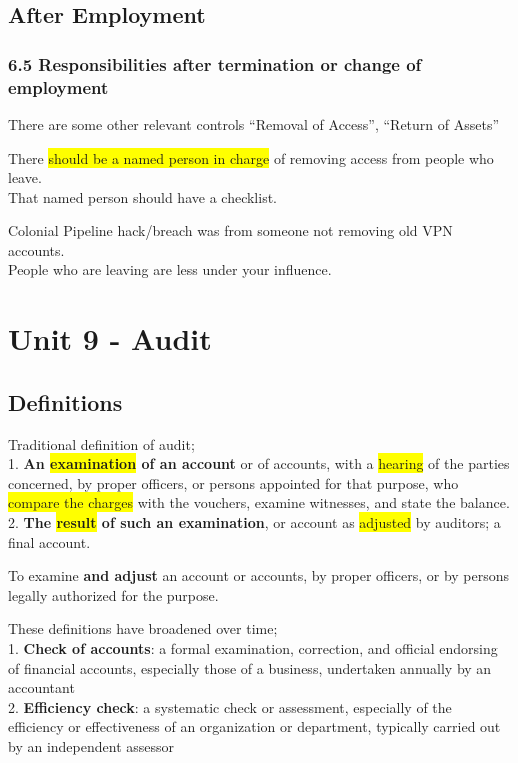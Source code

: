 \documentclass[tikz,border=10pt]{project_plan}
\begin{document}
\section{After Employment}

\subsection{6.5 Responsibilities after termination or change of employment}

There are some other relevant controls “Removal of Access”, “Return of Assets”

There \colorbox{yellow}{should be a named person in charge} of removing access from people who leave. \\
That named person should have a checklist.

Colonial Pipeline hack/breach was from someone not removing old VPN accounts.\\
People who are leaving are less under your influence.

\chapter{Unit 9 - Audit}

\section{Definitions}

Traditional definition of audit;\\
1. \textbf{An \colorbox{yellow}{examination} of an account} or of accounts, with a \colorbox{yellow}{hearing} of the parties
concerned, by proper officers, or persons appointed for that purpose, who
\colorbox{yellow}{compare the charges} with the vouchers, examine witnesses, and state the balance. \\
2. \textbf{The \colorbox{yellow}{result} of such an examination}, or account as \colorbox{yellow}{adjusted} by auditors; a final account.

To examine \textbf{and adjust} an account or accounts, by proper officers, or by persons
legally authorized for the purpose.

These definitions have broadened over time;\\
1. \textbf{Check of accounts}: a formal examination, correction, and official endorsing
of financial accounts, especially those of a business, undertaken annually by an accountant \\
2. \textbf{Efficiency check}: a systematic check or assessment, especially of the
efficiency or effectiveness of an organization or department, typically carried
out by an independent assessor
\end{document}
